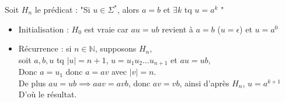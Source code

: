 \documentclass[varwidth = 10cm]{standalone}
\begin{document}
Soit $H_n$ le prédicat : "Si $u \in \Sigma^*$, alors $a=b$ et $\exists k$ tq $u = a^k$ "

\begin{itemize}
    \item Initialisation : $H_0$ est vraie car $au = ub$ revient à $a = b$ ($u = \epsilon$) et $u = a^0$
    \item Récurrence : si $n \in \mathbb{N}$, supposons $H_n$, \\
    soit $a, b, u$ tq $|u| = n + 1$, $u = u_1u_2...u_{n+1}$ et $au = ub$, \\
    Donc $ a = u_1$ donc $ a = av $ avec $|v| = n$. \\
    De plus $au = ub \implies aav = avb$, donc $av = vb$, ainsi d'après $H_n$, $u = a^{k+1}$ \\
    D'où le résultat.
\end{itemize}
\end{document}
